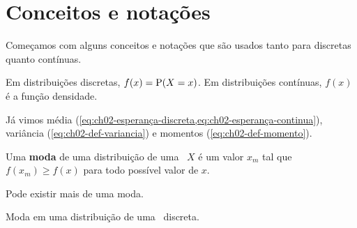 \section{Conceitos e notações}

Começamos com alguns conceitos e notações que são 
usados tanto para discretas quanto contínuas.

Em distribuições discretas, $f(x) = \operatorname{P}(X = x)$.
Em distribuições contínuas, $f(x)$ é a função densidade.

Já vimos média (\cref{eq:ch02-esperança-discreta,eq:ch02-esperança-continua}), variância (\cref{eq:ch02-def-variancia}) e momentos
(\cref{eq:ch02-def-momento}).

\begin{definition}[Moda]
    Uma \textbf{moda} de uma distribuição de uma \va\ $X$
    é um valor $x_m$ tal que $f(x_m) \ge f(x)$ para
    todo possível valor de $x$.

    Pode existir mais de uma moda.
\end{definition}

\begin{example}
    Moda em uma distribuição de uma \va\ discreta.
    \begin{center}
    \end{center}
\end{example}

